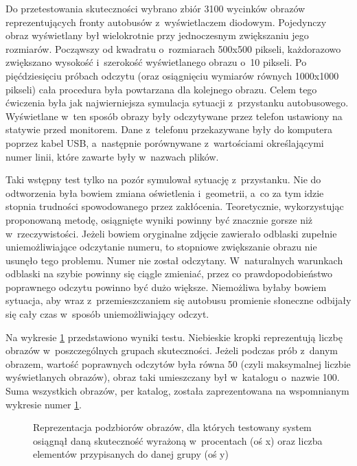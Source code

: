 Do przetestowania skuteczności wybrano zbiór 3100 wycinków
obrazów reprezentujących fronty autobusów z~wyświetlaczem
diodowym. Pojedynczy obraz wyświetlany był wielokrotnie
przy jednoczesnym zwiększaniu jego rozmiarów.
Począwszy od kwadratu o~rozmiarach 500x500 pikseli, 
każdorazowo zwiększano wysokość i~szerokość wyświetlanego obrazu
o~10 pikseli. Po pięćdziesięciu próbach odczytu (oraz osiągnięciu
wymiarów równych 1000x1000 pikseli) cała procedura była powtarzana
dla kolejnego obrazu.
Celem tego ćwiczenia była jak najwierniejsza
 symulacja sytuacji z~przystanku autobusowego.
Wyświetlane w~ten sposób obrazy były odczytywane przez
telefon ustawiony na statywie przed monitorem.
Dane z~telefonu przekazywane były do komputera poprzez 
kabel USB, a~następnie porównywane z~wartościami określającymi
numer linii, które zawarte były w~nazwach plików.

Taki wstępny test tylko
na pozór symulował sytuację z~przystanku. Nie do odtworzenia
była bowiem zmiana oświetlenia i~geometrii, a~co za tym idzie
stopnia trudności spowodowanego przez zakłócenia. Teoretycznie,
wykorzystując proponowaną metodę, osiągnięte wyniki
powinny być znacznie gorsze niż w~rzeczywistości. 
Jeżeli bowiem oryginalne zdjęcie zawierało odblaski zupełnie 
uniemożliwiające odczytanie numeru, to stopniowe zwiększanie obrazu 
nie usunęło tego problemu.
Numer nie został odczytany. W~naturalnych warunkach odblaski
na szybie powinny się ciągle zmieniać, przez co prawdopodobieństwo 
poprawnego odczytu powinno być dużo większe. Niemożliwa byłaby bowiem sytuacja,
 aby wraz z~przemieszczaniem się autobusu
promienie słoneczne odbijały się cały czas w~sposób uniemożliwiający odczyt.

Na wykresie \ref{chart:final_device_test} przedstawiono wyniki testu.
Niebieskie kropki reprezentują liczbę obrazów w~poszczególnych
grupach skuteczności. Jeżeli podczas prób z~danym obrazem, wartość
poprawnych odczytów była równa 50 (czyli maksymalnej liczbie wyświetlanych obrazów), obraz taki umieszczany był w~katalogu o~nazwie 100. Suma wszystkich
obrazów, per katalog, została zaprezentowana na wspomnianym wykresie
numer \ref{chart:final_device_test}. 

\begin{figure}[h!]
	\begin{center}
	\end{center}
	\caption{Reprezentacja podzbiorów obrazów, dla których
		testowany system osiągnął daną skuteczność wyrażoną w~procentach 
		(oś x) oraz liczba elementów przypisanych do danej grupy (oś y)}
	\label{chart:final_device_test}
\end{figure}

